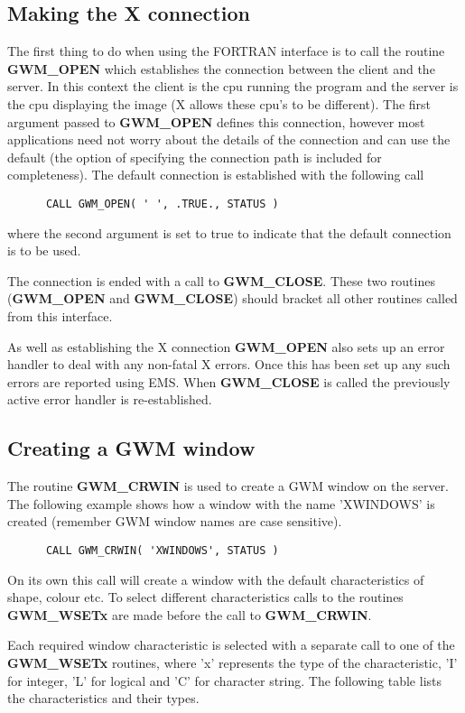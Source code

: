 \subsection{Making the X connection}
The first thing to do when using the FORTRAN interface is to call
the routine {\bf GWM\_OPEN} which establishes the connection between
the client and the server. In this context the client is the cpu running
the program and the server is the cpu displaying the image (X allows
these cpu's to be different). The first argument passed to {\bf GWM\_OPEN}
defines this connection, however most applications need not worry about
the details of the connection and can use the default (the option of
specifying the connection path is included for completeness). The default
connection is established with the following call
\begin{verbatim}
      CALL GWM_OPEN( ' ', .TRUE., STATUS )
\end{verbatim}
where the second argument is set to true to indicate that the default
connection is to be used.

The connection is ended with a call to {\bf GWM\_CLOSE}. These two routines
({\bf GWM\_OPEN} and {\bf GWM\_CLOSE}) should bracket all other routines
called from this interface.

As well as establishing the X connection {\bf GWM\_OPEN} also sets up
an error handler to deal with any non-fatal X errors. Once this has been
set up any such errors are reported using EMS. When {\bf GWM\_CLOSE} is
called the previously active error handler is re-established.

\subsection{Creating a GWM window}
The routine {\bf GWM\_CRWIN} is used to create a GWM window on the
server. The following example shows how a window with the name 'XWINDOWS'
is created (remember GWM window names are case sensitive).
\begin{verbatim}
      CALL GWM_CRWIN( 'XWINDOWS', STATUS )
\end{verbatim}
On its own this call will create a window with the default characteristics
of shape, colour etc. To select different characteristics calls to the
routines {\bf GWM\_WSETx} are made before the call to {\bf GWM\_CRWIN}.

Each required window characteristic is selected with a separate call to
one of the {\bf GWM\_WSETx} routines, where 'x' represents the type of
the characteristic, 'I' for integer, 'L' for logical and 'C' for character
string. The following table lists the characteristics and their types.

